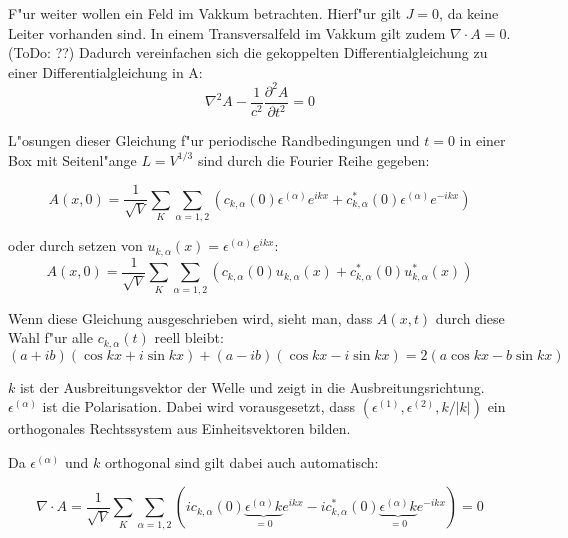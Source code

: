 F"ur weiter wollen ein Feld im Vakkum betrachten. Hierf"ur gilt $J = 0$, da keine Leiter vorhanden sind.
In einem Transversalfeld im Vakkum gilt zudem $\nabla \cdot A = 0$. (ToDo: ??) Dadurch vereinfachen sich die gekoppelten Differentialgleichung zu einer Differentialgleichung in A:
\begin{equation}
\nabla^2 A - \frac{1}{c^2} \frac{\partial^2 A }{\partial t^2} = 0
\end{equation}

L"osungen dieser Gleichung f"ur periodische Randbedingungen und $t=0$ in einer Box mit Seitenl"ange $L = V^{1/3}$ sind durch die Fourier Reihe gegeben:

\begin{equation}
A(x,0) = \frac{1}{\sqrt{V}} \sum_K \sum_{\alpha=1,2} (c_{k,\alpha}(0) \epsilon^{(\alpha)} e^{ikx} + c^*_{k,\alpha}(0) \epsilon^{(\alpha)} e^{-ikx})
\end{equation}

oder durch setzen von $u_{k,\alpha}(x) = \epsilon^{(\alpha)} e^{ikx}$:
\begin{equation}
A(x,0) = \frac{1}{\sqrt{V}} \sum_K \sum_{\alpha=1,2} (c_{k,\alpha}(0)u_{k,\alpha}(x) + c^*_{k,\alpha}(0) u^*_{k,\alpha}(x))
\end{equation}

Wenn diese Gleichung ausgeschrieben wird, sieht man, dass $A(x,t)$ durch diese Wahl f"ur alle $c_{k,\alpha}(t)$ reell bleibt:
\begin{equation}
(a + ib)(\cos kx + i \sin kx ) + (a - ib)(\cos kx - i \sin kx ) = 2 ( a \cos kx - b \sin kx )
\end{equation}

$k$ ist der Ausbreitungsvektor der Welle und zeigt in die Ausbreitungsrichtung. $\epsilon^{(\alpha)}$ ist die Polarisation. Dabei wird vorausgesetzt, dass $(\epsilon^{(1)}, \epsilon^{(2)} , k/|k|)$ ein orthogonales Rechtssystem aus Einheitsvektoren bilden.

Da $\epsilon^{(\alpha)}$ und $k$ orthogonal sind gilt dabei auch automatisch:

\begin{equation}
\nabla \cdot A = \frac{1}{\sqrt{V}} \sum_K \sum_{\alpha=1,2} (i c_{k,\alpha}(0) \underbrace{\epsilon^{(\alpha)} k}_{=0} e^{ikx} - i c^*_{k,\alpha}(0) \underbrace{\epsilon^{(\alpha)} k}_{=0} e^{-ikx}) = 0
\end{equation}

